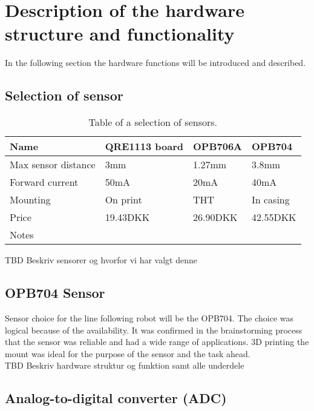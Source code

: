 \section{Description of the hardware structure and functionality}
In the following section the hardware functions will be introduced and described.
\subsection{Selection of sensor}

\begin{table}[htbp]
    \begin{tabular}{|l|l|l|l|}
        \hline
        Name                & QRE1113 board & OPB706A  & OPB704    \\ \hline
        Max sensor distance & 3mm                            & 1.27mm   & 3.8mm     \\ \hline
        Forward current     & 50mA                           & 20mA     & 40mA      \\ \hline
        Mounting            & On print                       & THT      & In casing \\ \hline
        Price               & 19.43DKK                       & 26.90DKK & 42.55DKK  \\ \hline
        Notes               & ~                              & ~        & ~         \\
        \hline
    \end{tabular}
    \caption{Table of a selection of sensors.}
\label{sensor_table}
\end{table}


TBD Beskriv sensorer og hvorfor vi har valgt denne
\newline
\subsection{OPB704 Sensor}
Sensor choice for the line following robot will be the OPB704. The choice was logical because of the availability. It was confirmed in the brainstorming process that the sensor was reliable and had a wide range of applications. 3D printing the mount was ideal for the purpose of the sensor and the task ahead.
\newline 
\\
TBD Beskriv hardware 
struktur og funktion samt alle underdele


\subsection{Analog-to-digital converter (ADC)}

